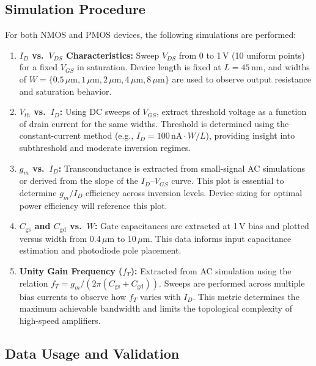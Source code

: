 \documentclass[11pt]{article}
\begin{document}
\subsection{Simulation Procedure}

For both NMOS and PMOS devices, the following simulations are performed:

\begin{enumerate}
    \item \textbf{$I_D$ vs.\ $V_{DS}$ Characteristics:} Sweep $V_{DS}$ from 0 to 1\,V (10 uniform points) for a fixed $V_{GS}$ in saturation. Device length is fixed at $L = 45$\,nm, and widths of $W = \{0.5\,\mu\mathrm{m}, 1\,\mu\mathrm{m}, 2\,\mu\mathrm{m}, 4\,\mu\mathrm{m}, 8\,\mu\mathrm{m} \}$ are used to observe output resistance and saturation behavior.
    
    \item \textbf{$V_{th}$ vs.\ $I_D$:} Using DC sweeps of $V_{GS}$, extract threshold voltage as a function of drain current for the same widths. Threshold is determined using the constant-current method (e.g., $I_D = 100\,\mathrm{nA} \cdot W/L$), providing insight into subthreshold and moderate inversion regimes.
    
    \item \textbf{$g_m$ vs.\ $I_D$:} Transconductance is extracted from small-signal AC simulations or derived from the slope of the $I_D$–$V_{GS}$ curve. This plot is essential to determine $g_m/I_D$ efficiency across inversion levels. Device sizing for optimal power efficiency will reference this plot.
    
    \item \textbf{$C_{\text{gs}}$ and $C_{\text{gd}}$ vs.\ $W$:} Gate capacitances are extracted at 1\,V bias and plotted versus width from 0.4\,$\mu$m to 10\,$\mu$m. This data informs input capacitance estimation and photodiode pole placement.
    
    \item \textbf{Unity Gain Frequency ($f_T$):} Extracted from AC simulation using the relation $f_T = g_m/(2\pi(C_{\text{gs}} + C_{\text{gd}}))$. Sweeps are performed across multiple bias currents to observe how $f_T$ varies with $I_D$. This metric determines the maximum achievable bandwidth and limits the topological complexity of high-speed amplifiers.
\end{enumerate}

\subsection{Data Usage and Validation}
\end{document}
